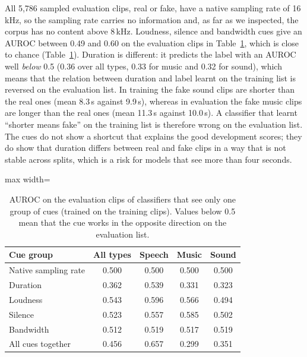 All 5{,}786 sampled evaluation clips, real or fake, have a native sampling rate of 16\,kHz, so the sampling rate carries no information and, as far as we inspected, the corpus has no content above 8\,kHz. Loudness, silence and bandwidth cues give an AUROC between 0.49 and 0.60 on the evaluation clips in Table~\ref{tab:shortcuts}, which is close to chance (Table~\ref{tab:shortcuts}). Duration is different: it predicts the label with an AUROC well \emph{below} 0.5 (0.36 over all types, 0.33 for music and 0.32 for sound), which means that the relation between duration and label learnt on the training list is reversed on the evaluation list. In training the fake sound clips are shorter than the real ones (mean 8.3\,s against 9.9\,s), whereas in evaluation the fake music clips are longer than the real ones (mean 11.3\,s against 10.0\,s). A classifier that learnt ``shorter means fake'' on the training list is therefore wrong on the evaluation list. The cues do not show a shortcut that explains the good development scores; they do show that duration differs between real and fake clips in a way that is not stable across splits, which is a risk for models that see more than four seconds.

\begin{table}[htbp]
\centering
\caption{AUROC on the evaluation clips of classifiers that see only one group of cues (trained on the training clips). Values below 0.5 mean that the cue works in the opposite direction on the evaluation list.}
\label{tab:shortcuts}
\small
\begin{adjustbox}{max width=\textwidth}
\begin{tabular}{@{}lcccc@{}}
\toprule
Cue group & All types & Speech & Music & Sound \\
\midrule
Native sampling rate & 0.500 & 0.500 & 0.500 & 0.500 \\
Duration & 0.362 & 0.539 & 0.331 & 0.323 \\
Loudness & 0.543 & 0.596 & 0.566 & 0.494 \\
Silence & 0.523 & 0.557 & 0.585 & 0.502 \\
Bandwidth & 0.512 & 0.519 & 0.517 & 0.519 \\
All cues together & 0.456 & 0.657 & 0.299 & 0.351 \\
\bottomrule
\end{tabular}
\end{adjustbox}
\end{table}


